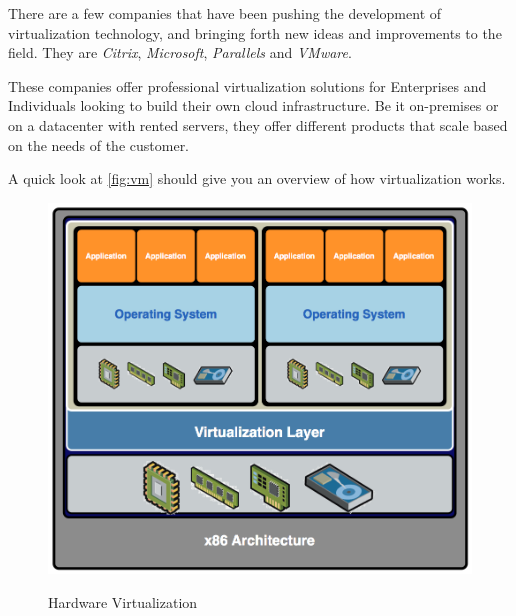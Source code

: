There are a few companies that have been pushing the development of virtualization technology, and bringing forth new ideas and improvements to the field. They are \textit{Citrix}, \textit{Microsoft}, \textit{Parallels} and \textit{VMware}.

These companies offer professional virtualization solutions for Enterprises and Individuals looking to build their own cloud infrastructure. Be it on-premises or on a datacenter with rented servers, they offer different products that scale based on the needs of the customer.

A quick look at \autoref{fig:vm} should give you an overview of how virtualization works. 

\begin{figure}[H]
    \begin{center}
        {\includegraphics[width=.75\linewidth]{gfx/vm}}
        \caption[Hardware Virtualization]{Hardware Virtualization\footnotemark}\label{fig:vm}
    \end{center}
\end{figure}
\\

